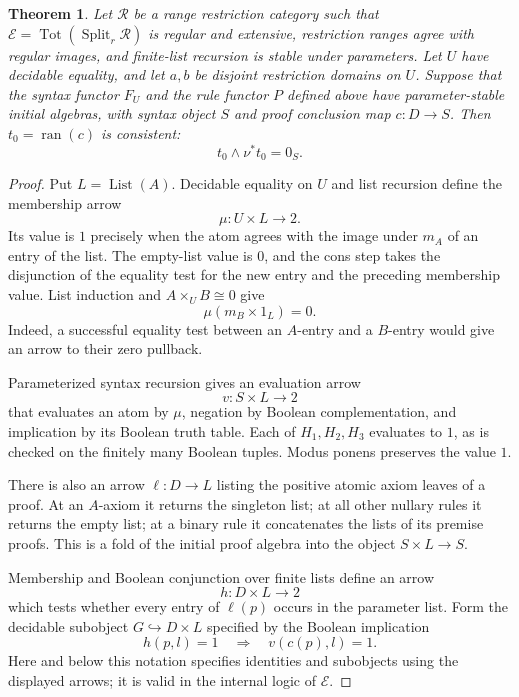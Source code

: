 \documentclass[11pt]{article}
\newtheorem{theorem}{Theorem}[section]
\theoremstyle{definition}
\theoremstyle{remark}
\newcommand{\R}{\mathscr R}
\newcommand{\ran}{\operatorname{ran}}
\newcommand{\Tot}{\operatorname{Tot}}
\begin{document}
\begin{theorem}\label{gen:finite-valuation-consistency}
Let $\R$ be a range restriction category such that
$\mathscr E=\Tot(\operatorname{Split}_r\R)$ is regular and
extensive, restriction ranges agree with regular images, and
finite-list recursion is stable under parameters. Let $U$ have
decidable equality, and let $a,b$ be disjoint restriction domains
on $U$. Suppose that the syntax functor $F_U$ and the rule functor
$P$ defined above have parameter-stable initial algebras, with
syntax object $S$ and proof conclusion map $c:D\to S$.
Then $t_0=\ran(c)$ is consistent:
\[
 t_0\wedge\nu^*t_0=0_S.
\]
\end{theorem}
\begin{proof}
Put $L=\operatorname{List}(A)$. Decidable equality on $U$ and list
recursion define the membership arrow
\[
 \mu:U\times L\longrightarrow2.
\]
Its value is $1$ precisely when the atom agrees with the image under
$m_A$ of an entry of the list. The empty-list value is $0$, and the
cons step takes the disjunction of the equality test for the new entry
and the preceding membership value. List induction and
$A\times_U B\cong0$ give
\begin{equation}\label{gen:negative-list}
 \mu(m_B\times1_L)=0.
\end{equation}
Indeed, a successful equality test between an $A$-entry and a $B$-entry
would give an arrow to their zero pullback.

Parameterized syntax recursion gives an evaluation arrow
\[
 v:S\times L\longrightarrow2
\]
that evaluates an atom by $\mu$, negation by Boolean complementation,
and implication by its Boolean truth table. Each of $H_1,H_2,H_3$
evaluates to $1$, as is checked on the finitely many Boolean tuples.
Modus ponens preserves the value $1$.

There is also an arrow $\ell:D\to L$ listing the positive atomic
axiom leaves of a proof. At an $A$-axiom it returns the singleton list;
at all other nullary rules it returns the empty list; at a binary rule
it concatenates the lists of its premise proofs. This is a fold of the
initial proof algebra into the object $S\times L\to S$.

Membership and Boolean conjunction over finite lists define an arrow
\[
 h:D\times L\longrightarrow2
\]
which tests whether every entry of $\ell(p)$ occurs in the parameter
list. Form the decidable subobject $G\hookrightarrow D\times L$
specified by the Boolean implication
\begin{equation}\label{gen:good-proof}
 h(p,l)=1\quad\Longrightarrow\quad v(c(p),l)=1.
\end{equation}
Here and below this notation specifies identities and subobjects using
the displayed arrows; it is valid in the internal logic of
$\mathscr E$.


\end{proof}
\end{document}
